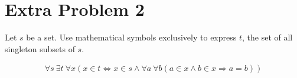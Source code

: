 \documentclass[10pt]{mypackage}
\begin{document}
\section{Extra Problem 2}%
\begin{problem}
  Let $s$ be a set. Use mathematical symbols exclusively to express $t$, the set of all singleton subsets of $s$.
\end{problem}
\begin{solution}
  \begin{align*}
    \forall s\:\exists t\:\forall x\left(x\in t \Leftrightarrow x\in s \wedge \forall a\:\forall b\left(a\in x \wedge b\in x \Rightarrow a = b\right)\right)
  \end{align*}
\end{solution}
\end{document}
